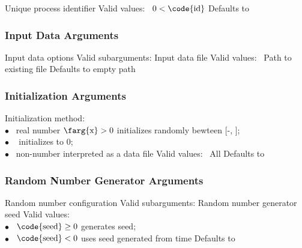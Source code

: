\begin{description}
  {Unique process identifier}
  {Valid values: \  $0 < \mbox{\code{id}}$}
  {Defaults to }
%
\end{description}

\subsubsection{Input Data Arguments}

\begin{description}

  {Input data options}
  {Valid subarguments: }
%
    {Input data file}
    {Valid values: \  Path to existing file}
    {Defaults to empty path}
%
\end{description}

\subsubsection{Initialization Arguments}

\begin{description}
  {Initialization method: \\
        \hspace*{8pt} $\bullet$ \ real number $\mbox{\farg{x}} > 0$ initializes randomly bewteen [-,
        ]; 
        \\
        \hspace*{8pt} $\bullet$ \   initializes to 0; 
        \\
        \hspace*{8pt} $\bullet$ \  non-number interpreted as a data file}
  {Valid values: \  All}
  {Defaults to }
%
\end{description}


\subsubsection{Random Number Generator Arguments}

\begin{description}

  {Random number configuration}
  {Valid subarguments: }
%
    {Random number generator seed}
    {Valid values: \\
      \hspace*{8pt} $\bullet$ \ $\mbox{\code{seed}} \geq 0$ generates seed; 
      \\
      \hspace*{8pt} $\bullet$ \ $\mbox{\code{seed}} < 0$ uses seed generated from time}
    {Defaults to }
%
\end{description}

